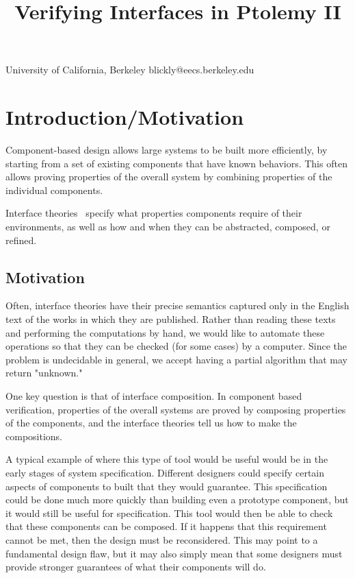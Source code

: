 \documentclass[preprint,11pt]{sigplanconf}
\begin{document}
\title{Verifying Interfaces in Ptolemy II}

           {University of California, Berkeley} {blickly@eecs.berkeley.edu}

\maketitle

\newcommand{\fixme}[1]{\textcolor{red}{(FIXME: #1)}}

\begin{abstract}
\end{abstract}

\section{Introduction/Motivation}
Component-based design allows large systems to be built more efficiently, by
starting from a set of existing components that have known behaviors. This
often allows proving properties of the overall system by combining properties
of the individual components.

Interface theories~\cite{interfaceTheories} specify what properties components
require of their environments, as well as how and when they can be abstracted,
composed, or refined.

\subsection{Motivation}
Often, interface theories have their precise semantics captured only in the
English text of the works in which they are published. Rather than reading these
texts and performing the computations by hand, we would like to automate these
operations so that they can be checked (for some cases) by a computer. Since the
problem is undecidable in general, we accept having a partial algorithm that may
return "unknown."

One key question is that of interface composition.  In component based
verification, properties of the overall systems are proved by composing
properties of the components, and the interface theories tell us how to make
the compositions.

A typical example of where this type of tool would be useful would be in the
early stages of system specification. Different designers could specify certain
aspects of components to built that they would guarantee. This specification
could be done much more quickly than building even a prototype component, but
it would still be useful for specification. This tool would then be able to
check that these components can be composed. If it happens that this
requirement cannot be met, then the design must be reconsidered. This may point
to a fundamental design flaw, but it may also simply mean that some designers
must provide stronger guarantees of what their components will do.
\end{document}
